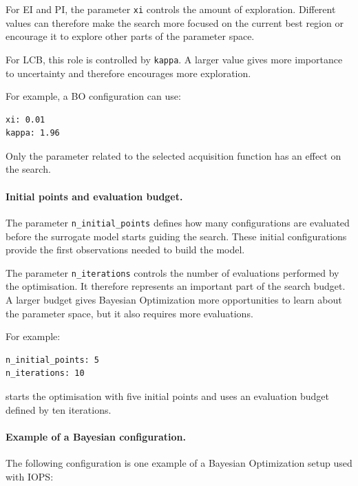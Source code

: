 For EI and PI, the parameter \texttt{xi} controls the amount of
exploration. Different values can therefore make the search more focused
on the current best region or encourage it to explore other parts of the
parameter space.

For LCB, this role is controlled by \texttt{kappa}. A larger value gives
more importance to uncertainty and therefore encourages more exploration.

For example, a BO configuration can use:

\begin{verbatim}
xi: 0.01
kappa: 1.96
\end{verbatim}

Only the parameter related to the selected acquisition function has an
effect on the search.

\paragraph{Initial points and evaluation budget.}

The parameter \texttt{n\_initial\_points} defines how many configurations
are evaluated before the surrogate model starts guiding the search. These
initial configurations provide the first observations needed to build the
model.

The parameter \texttt{n\_iterations} controls the number of evaluations
performed by the optimisation. It therefore represents an important part
of the search budget. A larger budget gives Bayesian Optimization more
opportunities to learn about the parameter space, but it also requires
more evaluations.

For example:

\begin{verbatim}
n_initial_points: 5
n_iterations: 10
\end{verbatim}

starts the optimisation with five initial points and uses an evaluation
budget defined by ten iterations.

\paragraph{Example of a Bayesian configuration.}

The following configuration is one example of a Bayesian Optimization
setup used with IOPS:

